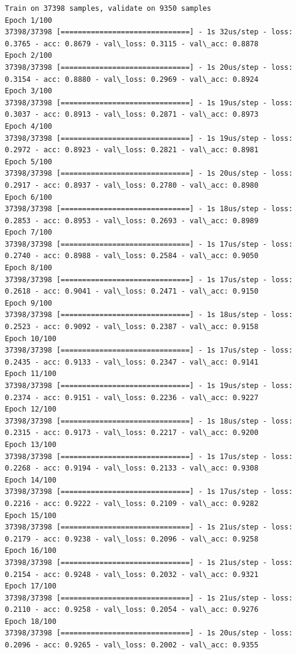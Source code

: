 \documentclass[11pt]{article}
\begin{document}
    \begin{Verbatim}[commandchars=\\\{\}]
Train on 37398 samples, validate on 9350 samples
Epoch 1/100
37398/37398 [==============================] - 1s 32us/step - loss: 0.3765 - acc: 0.8679 - val\_loss: 0.3115 - val\_acc: 0.8878
Epoch 2/100
37398/37398 [==============================] - 1s 20us/step - loss: 0.3154 - acc: 0.8880 - val\_loss: 0.2969 - val\_acc: 0.8924
Epoch 3/100
37398/37398 [==============================] - 1s 19us/step - loss: 0.3037 - acc: 0.8913 - val\_loss: 0.2871 - val\_acc: 0.8973
Epoch 4/100
37398/37398 [==============================] - 1s 19us/step - loss: 0.2972 - acc: 0.8923 - val\_loss: 0.2821 - val\_acc: 0.8981
Epoch 5/100
37398/37398 [==============================] - 1s 20us/step - loss: 0.2917 - acc: 0.8937 - val\_loss: 0.2780 - val\_acc: 0.8980
Epoch 6/100
37398/37398 [==============================] - 1s 18us/step - loss: 0.2853 - acc: 0.8953 - val\_loss: 0.2693 - val\_acc: 0.8989
Epoch 7/100
37398/37398 [==============================] - 1s 17us/step - loss: 0.2740 - acc: 0.8988 - val\_loss: 0.2584 - val\_acc: 0.9050
Epoch 8/100
37398/37398 [==============================] - 1s 17us/step - loss: 0.2618 - acc: 0.9041 - val\_loss: 0.2471 - val\_acc: 0.9150
Epoch 9/100
37398/37398 [==============================] - 1s 18us/step - loss: 0.2523 - acc: 0.9092 - val\_loss: 0.2387 - val\_acc: 0.9158
Epoch 10/100
37398/37398 [==============================] - 1s 17us/step - loss: 0.2435 - acc: 0.9133 - val\_loss: 0.2347 - val\_acc: 0.9141
Epoch 11/100
37398/37398 [==============================] - 1s 19us/step - loss: 0.2374 - acc: 0.9151 - val\_loss: 0.2236 - val\_acc: 0.9227
Epoch 12/100
37398/37398 [==============================] - 1s 18us/step - loss: 0.2315 - acc: 0.9173 - val\_loss: 0.2217 - val\_acc: 0.9200
Epoch 13/100
37398/37398 [==============================] - 1s 17us/step - loss: 0.2268 - acc: 0.9194 - val\_loss: 0.2133 - val\_acc: 0.9308
Epoch 14/100
37398/37398 [==============================] - 1s 17us/step - loss: 0.2216 - acc: 0.9222 - val\_loss: 0.2109 - val\_acc: 0.9282
Epoch 15/100
37398/37398 [==============================] - 1s 21us/step - loss: 0.2179 - acc: 0.9238 - val\_loss: 0.2096 - val\_acc: 0.9258
Epoch 16/100
37398/37398 [==============================] - 1s 21us/step - loss: 0.2154 - acc: 0.9248 - val\_loss: 0.2032 - val\_acc: 0.9321
Epoch 17/100
37398/37398 [==============================] - 1s 21us/step - loss: 0.2110 - acc: 0.9258 - val\_loss: 0.2054 - val\_acc: 0.9276
Epoch 18/100
37398/37398 [==============================] - 1s 20us/step - loss: 0.2096 - acc: 0.9265 - val\_loss: 0.2002 - val\_acc: 0.9355

\end{Verbatim}
\end{document}
